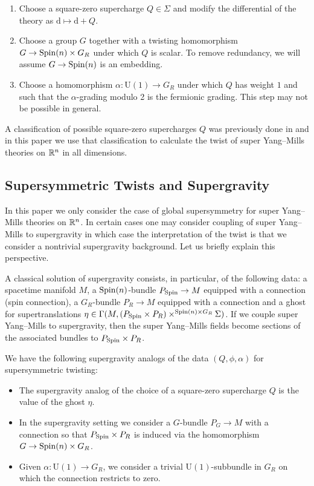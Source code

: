 \documentclass[10pt, oneside]{article}
\renewcommand{\U}{\mathrm{U}}
\begin{document}
\begin{enumerate}
\item Choose a square-zero supercharge $Q\in\Sigma$ and modify the differential of the theory as $\mathrm{d}\mapsto\mathrm{d}+Q$.

\item Choose a group $G$ together with a twisting homomorphism $G\rightarrow \mathrm{Spin}(n)\times G_R$ under which $Q$ is scalar. To remove redundancy, we will assume $G\rightarrow \mathrm{Spin}(n)$ is an embedding.

\item Choose a homomorphism $\alpha\colon \U(1)\rightarrow G_R$ under which $Q$ has weight $1$ and such that the $\alpha$-grading modulo 2 is the fermionic grading. This step may not be possible in general.
\end{enumerate}

A classification of possible square-zero supercharges $Q$ was previously done in \cite{ElliottSafronov} and in this paper we use that classification to calculate the twist of super Yang--Mills theories on $\mathbb R^n$ in all dimensions.

\subsection*{Supersymmetric Twists and Supergravity}

In this paper we only consider the case of global supersymmetry for super Yang--Mills theories on $\mathbb R^n$. In certain cases one may consider coupling of super Yang--Mills to supergravity in which case the interpretation of the twist is that we consider a nontrivial supergravity background. Let us briefly explain this perspective.

A classical solution of supergravity consists, in particular, of the following data: a spacetime manifold $M$, a $\mathrm{Spin}(n)$-bundle $P_{\mathrm{Spin}}\rightarrow M$ equipped with a connection (spin connection), a $G_R$-bundle $P_R\rightarrow M$ equipped with a connection and a ghost for supertranslations $\eta\in \Gamma(M, (P_{\mathrm{Spin}}\times P_R)\times^{\mathrm{Spin}(n)\times G_R}\Sigma)$. If we couple super Yang--Mills to supergravity, then the super Yang--Mills fields become sections of the associated bundles to $P_{\mathrm{Spin}}\times P_R$.

We have the following supergravity analogs of the data $(Q, \phi, \alpha)$ for supersymmetric twisting:
\begin{itemize}
\item The supergravity analog of the choice of a square-zero supercharge $Q$ is the value of the ghost $\eta$.

\item In the supergravity setting we consider a $G$-bundle $P_G\rightarrow M$ with a connection so that $P_{\mathrm{Spin}}\times P_R$ is induced via the homomorphism $G\rightarrow \mathrm{Spin}(n)\times G_R$.

\item Given $\alpha\colon \U(1)\rightarrow G_R$, we consider a trivial $\U(1)$-subbundle in $G_R$ on which the connection restricts to zero.
\end{itemize}
\end{document}

